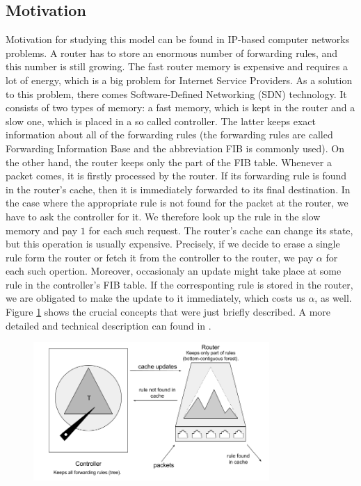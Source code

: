 \subsection{Motivation} Motivation for studying this model can be found in 
IP-based computer networks problems. A router has to store an enormous number of
forwarding rules, and this number is still growing. The fast router memory is
expensive and requires a lot of energy, which is a big problem for Internet
Service Providers. As a solution to this problem, there comes Software-Defined
Networking (SDN) technology. It consists of two types of memory: a fast memory,
which is kept in the router and a slow one, which is placed in a so called controller.
The latter keeps exact information about all of the forwarding rules (the
forwarding rules are called Forwarding Information Base and the abbreviation FIB
is commonly used).  On the other hand, the router keeps only the part of the FIB
table. Whenever a packet comes, it is firstly processed by the router. If its
forwarding rule is found in the router's cache, then it is immediately forwarded
to its final destination. In the case where the appropriate rule is not found for
the packet at the router, we have to ask the controller for it. We therefore look
up the rule in the slow memory and pay $1$ for each such request. The router's
cache can change its state, but this operation is usually expensive. Precisely,
if we decide to erase a single rule form the router or fetch it from the
controller to the router, we pay $\alpha$ for each such opertion. Moreover,
occasionaly an update might take place at some rule in the controller's FIB table.
If the corresponting rule is stored in the router, we are obligated to make the
update to it immediately, which costs us $\alpha$, as well. Figure
\ref{fig:motivation} shows the crucial concepts that were just briefly
described. A more detailed and technical description can found in \cite{sdn}.
\begin{figure} \begin{center}
\includegraphics[width=0.8\textwidth]{motivation.png} \end{center} \caption{}
\label{fig:motivation} \end{figure}


